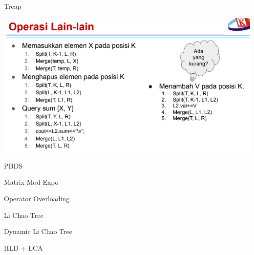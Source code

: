 \documentclass{article}
\newcommand{\mytitle}[1]{
    \begin{center}
        {\LARGE #1} \\[0.5cm]
    \end{center}
}
\begin{document}
\mytitle{Treap}



\includegraphics[width=0.8\linewidth]{../data-structures/treap-operations.png}

\pagebreak

\mytitle{PBDS}



\pagebreak

\mytitle{Matrix Mod Expo}



\pagebreak

\mytitle{Operator Overloading}



\pagebreak

\mytitle{Li Chao Tree}



\pagebreak

\mytitle{Dynamic Li Chao Tree}



\pagebreak

\mytitle{HLD + LCA}



\pagebreak
\end{document}
